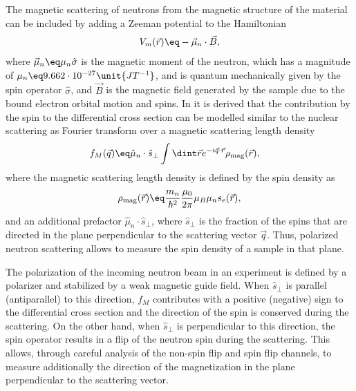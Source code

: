 \documentclass[\main/dresen_thesis.tex]{subfiles}
\begin{document}
    The magnetic scattering of neutrons from the magnetic structure of the material can be included by adding a Zeeman potential to the Hamiltonian
    \begin{align}
      V_m (\vec{r}) \eq - \vec{\mu}_n \cdot \vec{B},
    \end{align}
    where $\vec{\mu}_n \eq \mu_n \hat{\sigma}$ is the magnetic moment of the neutron, which has a magnitude of $\mu_n \eq 9.662 \cdot 10^{-27} \unit{JT^{-1}}$, and is quantum mechanically given by the spin operator $\hat{\sigma}$, and $\vec{B}$ is the magnetic field generated by the sample due to the bound electron orbital motion and spins.
    In  it is derived that the contribution by the spin to the differential cross section can be modelled similar to the nuclear scattering as Fourier transform over a magnetic scattering length density
    \begin{align}
      f_M (\vec{q}) \eq & \hat{\mu}_n \cdot \hat{s}_\perp \int \dint \vec{r} e^{- i \vec{q} \cdot \vec{r}} \rho_\mathrm{mag}(\vec{r}),
    \end{align}
    where the magnetic scattering length density is defined by the spin density as
    \begin{align}
      \rho_\mathrm{mag} (\vec{r}) \eq \frac{m_n}{\hbar^2}  \frac{\mu_0}{2\pi} \mu_B \mu_n s_e (\vec{r}),
      \label{eq:theoreticalBackground:scattering:magneticSLD}
    \end{align}
    and an additional prefactor $\hat{\mu}_n \cdot \hat{s}_\perp$, where $\hat{s}_\perp$ is the fraction of the spins that are directed in the plane perpendicular to the scattering vector $\vec{q}$.
    Thus, polarized neutron scattering allows to measure the spin density of a sample in that plane.

    The polarization of the incoming neutron beam in an experiment is defined by a polarizer and stabilized by a weak magnetic guide field.
    When $\hat{s}_\perp$ is parallel (antiparallel) to this direction, $f_M$ contributes with a positive (negative) sign to the differential cross section and the direction of the spin is conserved during the scattering.
    On the other hand, when $\hat{s}_\perp$ is perpendicular to this direction, the spin operator results in a flip of the neutron spin during the scattering.
    This allows, through careful analysis of the non-spin flip and spin flip channels, to measure additionally the direction of the magnetization in the plane perpendicular to the scattering vector.
\end{document}
